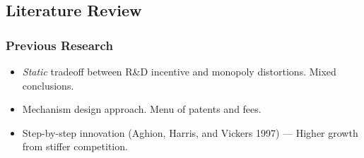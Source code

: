 \documentclass{beamer}
\begin{document}
\subsection{Literature Review}
\label{sub:literature_review}
\begin{frame}[t]\frametitle{Previous Research} 
  \begin{itemize}
	  \vspace{2mm}
    \item<+-> \emph{Static} tradeoff between R\&D incentive and monopoly distortions. Mixed conclusions.
	\vspace{2mm}
    \item<+-> Mechanism design approach.  Menu of patents and fees.
	\vspace{2mm}
    \item<+-> Step-by-step innovation (Aghion, Harris, and Vickers 1997) --- Higher growth from stiffer competition.
  \end{itemize}
\end{frame}


\end{document}
